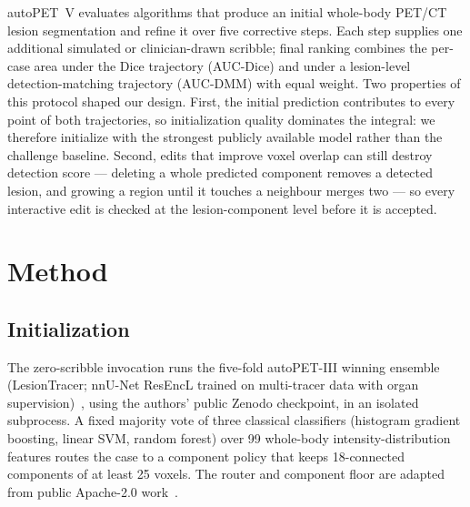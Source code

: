 \documentclass[runningheads]{llncs}
\begin{document}
autoPET~V evaluates algorithms that produce an initial whole-body PET/CT
lesion segmentation and refine it over five corrective steps. Each step
supplies one additional simulated or clinician-drawn scribble; final
ranking combines the per-case area under the Dice trajectory (AUC-Dice)
and under a lesion-level detection-matching trajectory (AUC-DMM) with
equal weight. Two properties of this protocol shaped our design. First,
the initial prediction contributes to every point of both trajectories, so
initialization quality dominates the integral: we therefore initialize
with the strongest publicly available model rather than the challenge
baseline. Second, edits that improve voxel overlap can still destroy
detection score --- deleting a whole predicted component removes a
detected lesion, and growing a region until it touches a neighbour merges
two --- so every interactive edit is checked at the lesion-component level
before it is accepted.

\section{Method}

\subsection{Initialization}
The zero-scribble invocation runs the five-fold autoPET-III winning
ensemble (LesionTracer; nnU-Net ResEncL trained on multi-tracer data with
organ supervision)~\cite{lesiontracer}, using the authors' public Zenodo
checkpoint, in an isolated subprocess. A fixed majority vote of three
classical classifiers (histogram gradient boosting, linear SVM, random
forest) over 99 whole-body intensity-distribution features routes the case
to a component policy that keeps 18-connected components of at least 25
voxels. The router and component floor are adapted from public Apache-2.0
work~\cite{autopetvrepo}.
\end{document}
